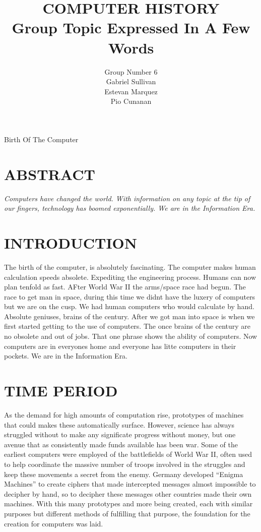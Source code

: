 \documentclass[letterpaper, 10 pt, conference]{IEEEconf}
\title{\LARGE \bf
COMPUTER HISTORY\\
\large Group Topic Expressed In A Few Words
}
\author{Group Number 6\\
\small Gabriel Sullivan\\
\small Estevan Marquez\\
\small Pio Cunanan\\
}
\begin{document}
\maketitle Birth Of The Computer
\thispagestyle{empty}
\pagestyle{empty}


\section*{ABSTRACT}
\textit{
Computers have changed the world. With information on any topic at the tip of our fingers, technology has boomed exponentially. We are in the Information Era.  
}

\section{INTRODUCTION}

The birth of the computer, is absolutely fascinating. The computer makes human calculation 
speeds absolete. Expediting the engineering process. Humans can now plan tenfold as fast. 
AFter World War II the arms/space race had begun. The race to get man in space, during this 
time we didnt have the luxery of computers but we are on the cusp. We had human computers who 
would calculate by hand. Absolute geniuses, brains of the century. After we got man into 
space is when we first started getting to the use of computers. The once brains of the 
century are no obsolete and out of jobs. That one phrase shows the ability of computers. Now 
computers are in everyones home and everyone has litte computers in their pockets. We are in 
the Information Era.

\section{TIME PERIOD}

As the demand for high amounts of computation rise, 
prototypes of machines that could makes these 
automatically surface. However, science has 
always struggled without to make any significate 
progress without money, but one avenue that as 
consistently made funds available has been war. 
Some of the earliest computers were employed of the 
battlefields of World War II, often used to help coordinate 
the massive number of troops involved in the struggles and 
keep these movements a secret from the enemy. Germany developed 
“Enigma Machines” to create ciphers that made intercepted messages 
almost impossible to decipher by hand, so to decipher these 
messages other countries made their own machines. With 
this many prototypes and more being created, each with 
similar purposes but different methods of fulfilling that purpose, 
the foundation for the creation for computers was laid.  
\end{document}
